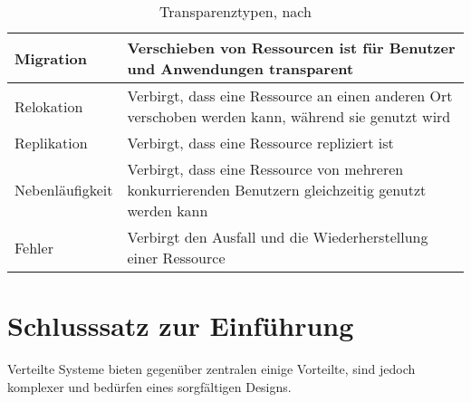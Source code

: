 \begin{description}
\begin{table}[h]
\begin{tabular}{ l |  p{11cm} }
				Migration & Verschieben von Ressourcen ist für Benutzer und Anwendungen transparent \\ \hline
				Relokation & Verbirgt, dass eine Ressource an einen anderen Ort verschoben werden kann, während sie genutzt wird \\ \hline
				Replikation &  Verbirgt, dass eine Ressource repliziert ist \\ \hline
				Nebenläufigkeit & Verbirgt, dass eine Ressource von mehreren konkurrierenden Benutzern gleichzeitig genutzt werden kann \\ \hline
				Fehler & Verbirgt den Ausfall und die Wiederherstellung einer Ressource \\
				
			\end{tabular}
			\caption{Transparenztypen, nach \cite[p.~23]{VS1}}
			\label{table:transparenztypen}
		\end{table}
\end{description}


 
\section{Schlusssatz zur Einführung}
Verteilte Systeme bieten gegenüber zentralen einige Vorteilte, sind jedoch komplexer und bedürfen eines sorgfältigen Designs.
